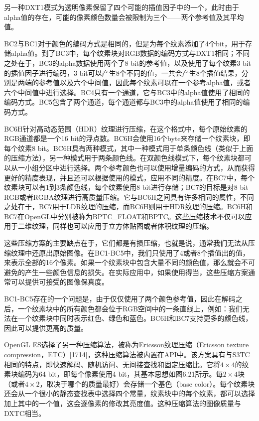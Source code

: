 \documentclass[
  paper=a4,
  ,captions=tableheading
]{scrartcl}
\renewenvironment{quote}{\begin{customblockquote}\list{}{\rightmargin=0em\leftmargin=0em}%
\item\relax\color{blockquote-text}\ignorespaces}{\unskip\unskip\endlist\end{customblockquote}}
\begin{document}
\begin{quote}
  另一种DXT1模式为透明像素保留了四个可能的插值因子中的一个，此时由于alpha值的存在，可能的像素颜色数量会被限制为三个------两个参考值及其平均值。
\end{quote}

BC2与BC1对于颜色的编码方式是相同的，但是为每个纹素添加了4个bit，用于存储alpha值。到了BC3中，每个纹素块对RGB数据的编码方式与DXT1相同；不同之处在于，BC3的alpha数据使用两个了8
bit的参考值，以及使用了每个纹素3 bit的插值因子进行编码，3
bit可以产生8个不同的值，一共会产生8个插值结果，分别是两端的参考值以及六个中间值，因此每个纹素可以在一个参考alpha值，或者六个中间值中进行选择。BC4只有一个通道，它与BC3中的alpha值使用了相同的编码方式。BC5包含了两个通道，每个通道都与BC3中的alpha值使用了相同的编码方式。

BC6H针对高动态范围（HDR）纹理进行压缩，在这个格式中，每个原始纹素的RGB通道都是一个16
bit的浮点数。BC6H会使用16个byte来存储一个纹素块，即每个纹素8
bit。BC6H具有两种模式，其中一种模式用于单条颜色线（类似于上面的压缩方法），另一种模式用于两条颜色线。在双颜色线模式下，每个纹素块都可以从一小组分区中进行选择。两个参考颜色也可以使用增量编码的方式，从而获得更好的精度表现，并且还可以根据使用的模式，应用不同的精度。在BC7中，每个纹素块可以有1到3条颜色线，每个纹素使用8
bit进行存储；BC7的目标是对8 bit
RGB或者RGBA纹理进行高质量压缩。它与BC6H之间具有许多相同的属性，不同之处在于，BC7用于LDR纹理的压缩，而BC6H则用于HDR纹理的压缩。BC6H和
BC7在OpenGL中分别被称为BPTC\_FLOAT和BPTC。这些压缩技术不仅可以应用于二维纹理，同样也可以应用于立方体贴图或者体积纹理的压缩。

这些压缩方案的主要缺点在于，它们都是有损压缩，也就是说，通常我们无法从压缩纹理中还原出原始图像。在BC1-BC5中，我们只使用了4或者8个插值出的值，来表示全部的16个像素。如果一个纹素块中包含大量不同的颜色值，那么就会不可避免的产生一些颜色信息的损失。在实际应用中，如果使用得当，这些压缩方案通常可以提供可接受的图像保真度。

BC1-BC5存在的一个问题是，由于仅仅使用了两个颜色参考值，因此在解码之后，一个纹素块中的所有颜色都会位于RGB空间中的一条直线上，例如：我们无法在一个纹素块中同时表示红色、绿色和蓝色。BC6H和BC7支持更多的颜色线，因此可以提供更高的质量。

OpenGL ES选择了另一种压缩算法，被称为Ericsson纹理压缩（Ericsson texture
compression，ETC）{[}1714{]}，这种压缩算法被内置在API中。该方案具有与S3TC相同的特点，即快速解码、随机访问、无间接查找和固定压缩比。它将\(4\times4\)的纹素块编码为64
bit，即每个像素使用4
bit，其基本思想如图6.21所示。每\(2 \times 4\)块（或者\(4 \times 2\)，取决于哪个的质量最好）会存储一个基色（base
color）。每个纹素块还会从一个很小的静态查找表中选择四个常量，纹素块中的每个纹素，都可以选择加上其中的一个值，这会逐像素的修改其亮度值。这种压缩算法的图像质量与DXTC相当。
\end{document}

